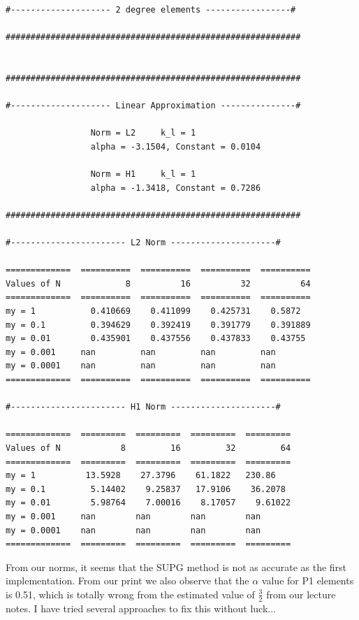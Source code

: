 \documentclass[a4paper,norsk]{article}
\begin{document}
\begin{lstlisting}[style=terminal]
#-------------------- 2 degree elements -----------------#

###########################################################


###########################################################

#-------------------- Linear Approximation ---------------#

                 Norm = L2     k_l = 1
                 alpha = -3.1504, Constant = 0.0104

                 Norm = H1     k_l = 1
                 alpha = -1.3418, Constant = 0.7286

###########################################################

#----------------------- L2 Norm ---------------------#

=============  ==========  ==========  ==========  ==========
Values of N             8          16          32          64
=============  ==========  ==========  ==========  ==========
my = 1           0.410669    0.411099    0.425731    0.5872
my = 0.1         0.394629    0.392419    0.391779    0.391889
my = 0.01        0.435901    0.437556    0.437833    0.43755
my = 0.001     nan         nan         nan         nan
my = 0.0001    nan         nan         nan         nan
=============  ==========  ==========  ==========  ==========

#----------------------- H1 Norm ---------------------#

=============  =========  =========  =========  =========
Values of N            8         16         32         64
=============  =========  =========  =========  =========
my = 1          13.5928    27.3796    61.1822   230.86
my = 0.1         5.14402    9.25837   17.9106    36.2078
my = 0.01        5.98764    7.00016    8.17057    9.61022
my = 0.001     nan        nan        nan        nan
my = 0.0001    nan        nan        nan        nan
=============  =========  =========  =========  =========

\end{lstlisting}
\newpage
From our norms, it seems that the SUPG method is not as accurate as the first
implementation. From our print we also observe that the $\alpha $ value for
P1 elements is 0.51, which is totally wrong from the estimated value of $\frac{3}{2}$
from our lecture notes. I have tried several approaches to fix this without luck...

\newpage


\newpage

\end{document}
